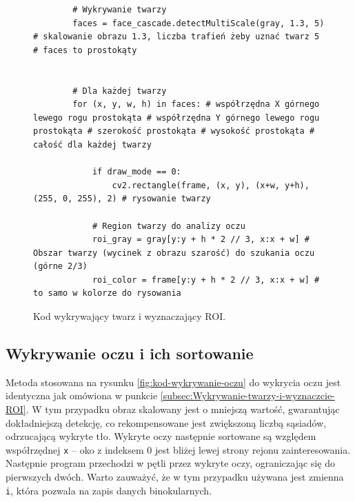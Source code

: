 \documentclass[a4paper,twoside,12pt]{book}
\begin{document}
\begin{figure}[htbp]
	\centering
	\begin{lstlisting}
		# Wykrywanie twarzy
        faces = face_cascade.detectMultiScale(gray, 1.3, 5) # skalowanie obrazu 1.3, liczba trafień żeby uznać twarz 5 # faces to prostokąty

        
        # Dla każdej twarzy
        for (x, y, w, h) in faces: # współrzędna X górnego lewego rogu prostokąta # współrzędna Y górnego lewego rogu prostokąta # szerokość prostokąta # wysokość prostokąta # całość dla każdej twarzy

            if draw_mode == 0:
                cv2.rectangle(frame, (x, y), (x+w, y+h), (255, 0, 255), 2) # rysowanie twarzy

            # Region twarzy do analizy oczu
            roi_gray = gray[y:y + h * 2 // 3, x:x + w] # Obszar twarzy (wycinek z obrazu szarość) do szukania oczu (górne 2/3)
            roi_color = frame[y:y + h * 2 // 3, x:x + w] # to samo w kolorze do rysowania
	\end{lstlisting}
\caption{Kod wykrywający twarz i wyznaczający ROI.}
\label{fig:kod-wykrywanie-twarzy}
\end{figure}

\subsection{Wykrywanie oczu i ich sortowanie}
\label{subsec:Wykrywanie-oczu-i-ich-sortowanie}

Metoda stosowana na rysunku \ref{fig:kod-wykrywanie-oczu} do wykrycia oczu jest identyczna jak omówiona w punkcie \ref{subsec:Wykrywanie-twarzy-i-wyznaczcie-ROI}. W tym przypadku obraz skalowany jest o mniejszą wartość, gwarantując dokładniejszą detekcję, co rekompensowane jest zwiększoną liczbą sąsiadów, odrzucającą wykryte tło. Wykryte oczy następnie sortowane są względem współrzędnej \texttt{x} -- oko z indeksem $0$ jest bliżej lewej strony rejonu zainteresowania. Następnie program przechodzi w pętli przez wykryte oczy, ograniczając się do pierwszych dwóch. Warto zauważyć, że w tym przypadku używana jest zmienna \texttt{i}, która pozwala na zapis danych binokularnych.
\end{document}
